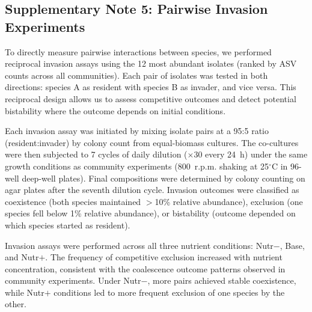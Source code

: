 \subsection*{Supplementary Note 5: Pairwise Invasion Experiments}
\label{sec:suppl:note5}

To directly measure pairwise interactions between species, we performed reciprocal invasion assays using the 12 most abundant isolates (ranked by ASV counts across all communities). Each pair of isolates was tested in both directions: species A as resident with species B as invader, and vice versa. This reciprocal design allows us to assess competitive outcomes and detect potential bistability where the outcome depends on initial conditions.

Each invasion assay was initiated by mixing isolate pairs at a 95:5 ratio (resident:invader) by colony count from equal-biomass cultures. The co-cultures were then subjected to 7 cycles of daily dilution ($\times$30 every 24~h) under the same growth conditions as community experiments (800~r.p.m. shaking at 25$^\circ$C in 96-well deep-well plates). Final compositions were determined by colony counting on agar plates after the seventh dilution cycle. Invasion outcomes were classified as coexistence (both species maintained $>$10\% relative abundance), exclusion (one species fell below 1\% relative abundance), or bistability (outcome depended on which species started as resident).

Invasion assays were performed across all three nutrient conditions: Nutr$-$, Base, and Nutr$+$. The frequency of competitive exclusion increased with nutrient concentration, consistent with the coalescence outcome patterns observed in community experiments. Under Nutr$-$, more pairs achieved stable coexistence, while Nutr$+$ conditions led to more frequent exclusion of one species by the other.

